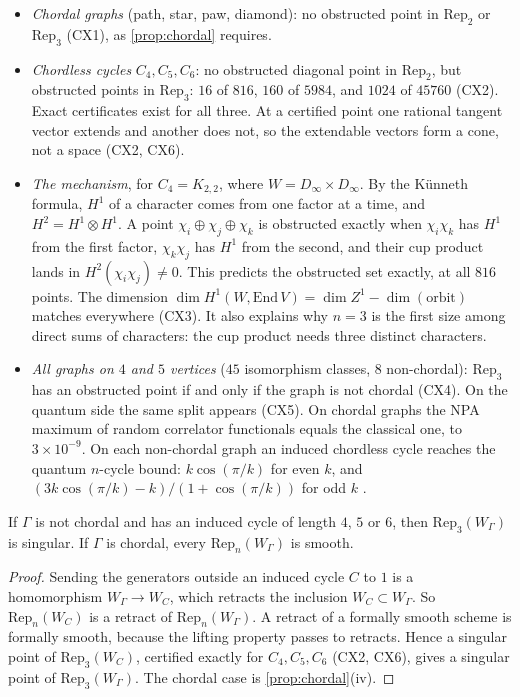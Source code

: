 \documentclass[11pt]{article}
\theoremstyle{definition}\newtheorem{definition}[theorem]{Definition}\newtheorem{remark}[theorem]{Remark}\newtheorem{example}[theorem]{Example}
\begin{document}
\begin{itemize}
\item \emph{Chordal graphs} (path, star, paw, diamond): no obstructed point in $\mathrm{Rep}_2$ or $\mathrm{Rep}_3$ (CX1), as
  \cref{prop:chordal} requires.
\item \emph{Chordless cycles} $C_4,C_5,C_6$: no obstructed diagonal point in $\mathrm{Rep}_2$, but obstructed points in $\mathrm{Rep}_3$:
  $16$ of $816$, $160$ of $5984$, and $1024$ of $45760$ (CX2). Exact certificates exist for all three. At a certified point one
  rational tangent vector extends and another does not, so the extendable vectors form a cone, not a space (CX2, CX6).
\item \emph{The mechanism}, for $C_4=K_{2,2}$, where $W=D_\infty\times D_\infty$. By the Künneth formula, $H^1$ of a character comes from
  one factor at a time, and $H^2=H^1\otimes H^1$. A point $\chi_i\oplus\chi_j\oplus\chi_k$ is obstructed exactly when $\chi_i\chi_k$ has
  $H^1$ from the first factor, $\chi_k\chi_j$ has $H^1$ from the second, and their cup product lands in $H^2(\chi_i\chi_j)\ne0$. This
  predicts the obstructed set exactly, at all $816$ points. The dimension $\dim H^1(W,\mathrm{End}\,V)=\dim Z^1-\dim(\text{orbit})$ matches
  everywhere (CX3). It also explains why $n=3$ is the first size among direct sums of characters: the cup product needs three distinct characters.
\item \emph{All graphs on $4$ and $5$ vertices} ($45$ isomorphism classes, $8$ non-chordal): $\mathrm{Rep}_3$ has an obstructed point
  if and only if the graph is not chordal (CX4). On the quantum side the same split appears (CX5). On chordal graphs the NPA maximum of
  random correlator functionals equals the classical one, to $3\times10^{-9}$. On each non-chordal graph an induced chordless cycle reaches
  the quantum $n$-cycle bound: $k\cos(\pi/k)$ for even $k$, and $(3k\cos(\pi/k)-k)/(1+\cos(\pi/k))$ for odd $k$ \cite{Araujo2013}.
\end{itemize}

\begin{proposition}\label{prop:rep3}
If $\Gamma$ is not chordal and has an induced cycle of length $4$, $5$ or $6$, then $\mathrm{Rep}_3(W_\Gamma)$ is singular. If $\Gamma$
is chordal, every $\mathrm{Rep}_n(W_\Gamma)$ is smooth.
\end{proposition}

\begin{proof}
Sending the generators outside an induced cycle $C$ to $1$ is a homomorphism $W_\Gamma\to W_C$, which retracts the inclusion
$W_C\subset W_\Gamma$. So $\mathrm{Rep}_n(W_C)$ is a retract of $\mathrm{Rep}_n(W_\Gamma)$. A retract of a formally smooth scheme is
formally smooth, because the lifting property passes to retracts. Hence a singular point of $\mathrm{Rep}_3(W_C)$, certified exactly for
$C_4,C_5,C_6$ (CX2, CX6), gives a singular point of $\mathrm{Rep}_3(W_\Gamma)$. The chordal case is \cref{prop:chordal}(iv).
\end{proof}
\end{document}

